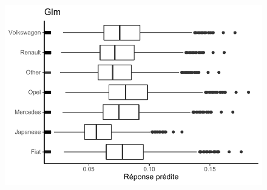 \begin{figure}[b]
\begin{minipage}{0.45\linewidth}
\includegraphics[scale=0.6]{Graphiques/iceBrandGlm}
\end{minipage}
\end{figure}


